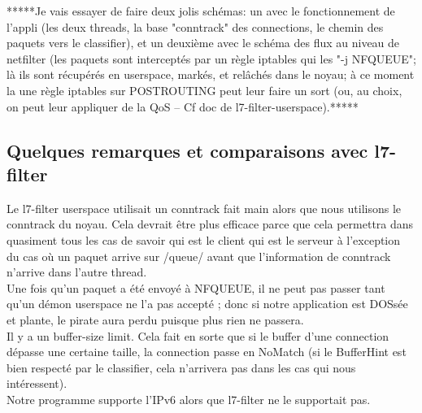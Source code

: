 *****Je vais essayer de faire deux jolis schémas: un avec le fonctionnement
de l'appli (les deux threads, la base "conntrack" des connections, le
chemin des paquets vers le classifier), et un deuxième avec le schéma
des flux au niveau de netfilter (les paquets sont interceptés par un
règle iptables qui les "-j NFQUEUE"; là ils sont récupérés en
userspace, markés, et relâchés dans le noyau; à ce moment la une règle
iptables sur POSTROUTING peut leur faire un sort (ou, au choix, on
peut leur appliquer de la QoS -- Cf doc de l7-filter-userspace).*****

\subsection*{Quelques remarques et comparaisons avec l7-filter}
Le l7-filter userspace utilisait un conntrack fait main alors que nous utilisons le conntrack du noyau. Cela devrait être plus efficace parce que cela permettra dans quasiment tous les cas de savoir qui est le client qui est le serveur à l'exception du cas où un paquet arrive sur /queue/ avant que l'information de conntrack n'arrive dans l'autre thread.\\

Une fois qu'un paquet a été envoyé à NFQUEUE, il ne peut pas passer
tant qu'un démon userspace ne l'a pas accepté ; donc si notre application est
DOSsée et plante, le pirate aura perdu puisque plus rien ne passera.\\

Il y a un buffer-size limit. Cela fait en sorte que si le
buffer d'une connection dépasse une certaine taille, la connection
passe en NoMatch (si le BufferHint est bien respecté par le
classifier, cela n'arrivera pas dans les cas qui nous intéressent).\\

Notre programme supporte l'IPv6 alors que l7-filter ne le supportait pas.\\
